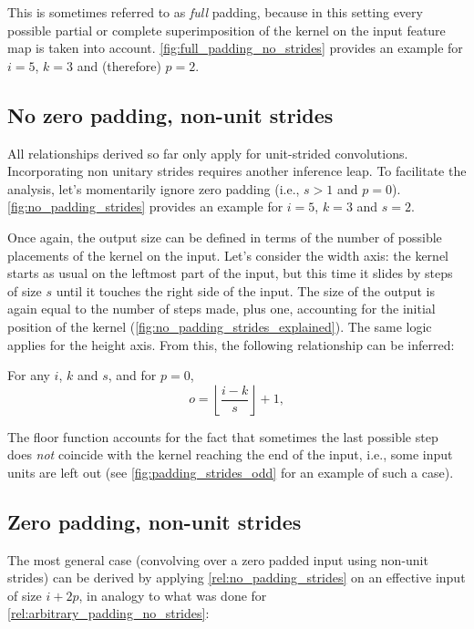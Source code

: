 \noindent This is sometimes referred to as {\em full\/} padding, because in this
setting every possible partial or complete superimposition of the kernel on the
input feature map is taken into account. \autoref{fig:full_padding_no_strides}
provides an example for $i = 5$, $k = 3$ and (therefore) $p = 2$.

\subsection{No zero padding, non-unit strides}

All relationships derived so far only apply for unit-strided convolutions.
Incorporating non unitary strides requires another inference leap. To
facilitate the analysis, let's momentarily ignore zero padding (i.e., $s > 1$
and $p = 0$). \autoref{fig:no_padding_strides} provides an example for $i =
5$, $k = 3$ and $s = 2$.

Once again, the output size can be defined in terms of the number of possible
placements of the kernel on the input. Let's consider the width axis: the
kernel starts as usual on the leftmost part of the input, but this time it
slides by steps of size $s$ until it touches the right side of the input. The
size of the output is again equal to the number of steps made, plus one,
accounting for the initial position of the kernel
(\autoref{fig:no_padding_strides_explained}). The same logic applies for the
height axis. From this, the following relationship can be inferred:

\begin{relationship}\label{rel:no_padding_strides}
For any $i$, $k$ and $s$, and for $p = 0$,
\begin{equation*}
    o = \left\lfloor \frac{i - k}{s} \right\rfloor + 1,
\end{equation*}
\end{relationship}

\noindent The floor function accounts for the fact that sometimes the last
possible step does {\em not\/} coincide with the kernel reaching the end of the
input, i.e., some input units are left out (see
\autoref{fig:padding_strides_odd} for an example of such a case).

\subsection{Zero padding, non-unit strides}

The most general case (convolving over a zero padded input using non-unit
strides) can be derived by applying \autoref{rel:no_padding_strides} on an
effective input of size $i + 2p$, in analogy to what was done for
\autoref{rel:arbitrary_padding_no_strides}:

